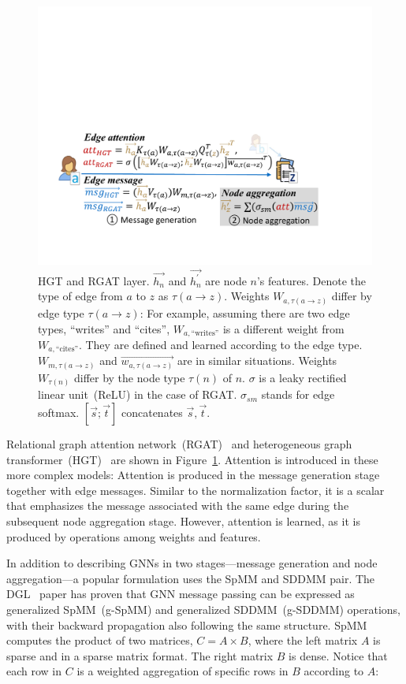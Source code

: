 \begin{figure}[!bt]
\centering
\includegraphics[width=0.8\linewidth]{figures/Hector/RGAT_HGT_v3.1.pdf}
\caption{\label{fig:rgat_layer} HGT and RGAT layer. $\overrightarrow{{h}_n}$ and $\overrightarrow{{h}_n^\prime}$ are node $n$'s features. Denote the type of edge from $a$ to $z$ as $\tau(a\rightarrow z)$. Weights $W_{a,\tau(a\rightarrow z)}$ differ by edge type $\tau(a\rightarrow z)$: For example, assuming there are two edge types, ``writes'' and ``cites'', $W_{a,\text{``writes''}}$ is a different weight from $W_{a,\text{``cites''}}$. They are defined and learned according to the edge type. $W_{m,\tau(a\rightarrow z)}$ and $\overrightarrow{{w}_{a,\tau(a\rightarrow z)}}$ are in similar situations. Weights $W_{\tau(n)}$ differ by the node type $\tau(n)$ of $n$. $\sigma$ is a leaky rectified linear unit~(ReLU) in the case of RGAT. $\sigma_{sm}$ stands for edge softmax. $[\vec{s};\vec{t}]$ concatenates $\vec{s}, \vec{t}$.}
\end{figure}

Relational graph attention network~(RGAT)~\cite{busbridge2019relational} and heterogeneous graph transformer~(HGT)~\cite{hgt} are shown in Figure~\ref{fig:rgat_layer}. Attention is introduced in these more complex models:
Attention is produced in the message generation stage together with edge messages.
Similar to the normalization factor, it is a scalar that emphasizes the message associated with the same edge during the subsequent node aggregation stage. However, attention is learned, as it is produced by operations among weights and features.

In addition to describing GNNs in two stages---message generation and node aggregation---a popular formulation uses the SpMM and SDDMM pair. The DGL~\cite{wang2019deep} paper has proven that GNN message passing can be expressed as generalized SpMM~(g-SpMM) and generalized SDDMM~(g-SDDMM) operations, with their backward propagation also following the same structure. SpMM computes the product of two matrices, $C=A\times B$, where the left matrix $A$ is sparse and in a sparse matrix format. The right matrix $B$ is dense. Notice that each row in $C$ is a weighted aggregation of specific rows in $B$ according to $A$:

